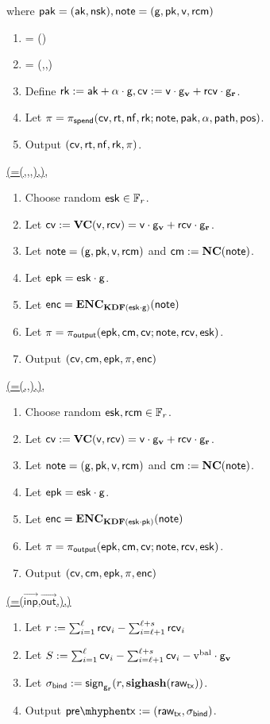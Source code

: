 \documentclass[11pt]{article}
\numberwithin{equation}{section} %
\numberwithin{figure}{section} %
\newcommand{\inps}{\ensuremath{\overrightarrow{\mathsf{inp}}}\xspace}
\newcommand{\outs}{\ensuremath{\overrightarrow{\mathsf{out}}}\xspace}
\begin{document}
where $\mathsf{pak}=(\mathsf{ak},\mathsf{nsk})
,\mathsf{note}=(\mathsf{g},
\mathsf{pk},\mathsf{v},\mathsf{rcm})$
\begin{enumerate}
\item \cm = \notecom(\note)
 \item \nf = \NF(\nk,\cm,\pos)
 \item Define $\mathsf{rk}:= \mathsf{ak} +\alpha\cdot \mathsf{g}, \mathsf{cv}:=  \mathsf{v}\cdot \mathsf{g}_{\mathbf{v}}+ \mathsf{rcv}\cdot \mathsf{g}_\mathbf{r} $.
 \item Let $\pi = \pi_{\mathsf{spend}}(\mathsf{cv},\mathsf{rt},\mathsf{nf},\mathsf{rk};\mathsf{note},\mathsf{pak},\alpha,\mathsf{path},\mathsf{pos})$.
 \item Output $(\mathsf{cv},\mathsf{rt},\mathsf{nf},\mathsf{rk},\pi)$.
\end{enumerate}

\noindent
\underline{\makeoutput(\note=(\gd,\pk,\val,\rcm),\rcv)},
\begin{enumerate}
 \item Choose random $\mathsf{esk}\in {\mathbb F}_r$.
 \item Let $\mathsf{cv}:= \mathbf{VC}(\mathsf{v},\mathsf{rcv}) = \mathsf{v}\cdot \mathsf{g}_{\mathbf{v}} + \mathsf{rcv}\cdot \mathsf{g}_\mathbf{r}$.
 \item Let $\mathsf{note} = (\mathsf{g},\mathsf{pk},\mathsf{v},\mathsf{rcm})$ and $\mathsf{cm}:= \mathbf{NC}(\mathsf{note})$.
 \item Let $\mathsf{epk} = \mathsf{esk}\cdot \mathsf{g}$.
 \item Let $\mathsf{enc} = \mathbf{ENC}_{\mathbf{KDF}(\mathsf{esk}\cdot \mathsf{g})}(\mathsf{note})$
 \item Let $\pi = \pi_{\mathsf{output}}(\mathsf{epk},\mathsf{cm},\mathsf{cv};\mathsf{note},\mathsf{rcv},\mathsf{esk})$.
 \item Output $(\mathsf{cv},\mathsf{cm},\mathsf{epk},\pi,\mathsf{enc})$
\end{enumerate}
\noindent
\underline{\makerandomizedoutput(\note=(\gd,\pk,\val),\rcv)},
\begin{enumerate}
 \item Choose random $\mathsf{esk},\mathsf{rcm}\in {\mathbb F}_r$.
 \item Let $\mathsf{cv}:= \mathbf{VC}(\mathsf{v},\mathsf{rcv}) = \mathsf{v}\cdot \mathsf{g}_{\mathbf{v}} + \mathsf{rcv}\cdot \mathsf{g}_\mathbf{r}$.
 \item Let $\mathsf{note} = (\mathsf{g},\mathsf{pk},\mathsf{v},\mathsf{rcm})$ and $\mathsf{cm}:= \mathbf{NC}(\mathsf{note})$.
 \item Let $\mathsf{epk} = \mathsf{esk}\cdot \mathsf{g}$.
 \item Let $\mathsf{enc} = \mathbf{ENC}_{\mathbf{KDF}(\mathsf{esk}\cdot \mathsf{pk})}(\mathsf{note})$
 \item Let $\pi = \pi_{\mathsf{output}}(\mathsf{epk},\mathsf{cm},\mathsf{cv};\mathsf{note},\mathsf{rcv},\mathsf{esk})$.
 \item Output $(\mathsf{cv},\mathsf{cm},\mathsf{epk},\pi,\mathsf{enc})$
\end{enumerate}
\noindent
\underline{\bindvaltx(\rawtx=(\inps,\outs,\vbal),\rcvs)}

\begin{enumerate}
 \item Let $r:=\sum_{i=1}^\ell \mathsf{rcv}_i - \sum_{i=\ell+1}^{\ell+s}\mathsf{rcv}_i$
 \item Let $S:=\sum_{i=1}^\ell \mathsf{cv}_i - \sum_{i=\ell+1}^{\ell+s}\mathsf{cv}_i-\mathrm{v^{bal}}\cdot \mathsf{g}_{\mathbf{v}}$
 \item Let $\sigma_{\mathsf{bind}} := \mathsf{sign}_{\mathsf{g}_\mathbf{r}}(r,\mathbf{sighash}(\mathsf{raw_{tx}}))$.
 \item Output $\pretx\defeq (\rawtx,\sigval)$.
\end{enumerate}
\end{document}
